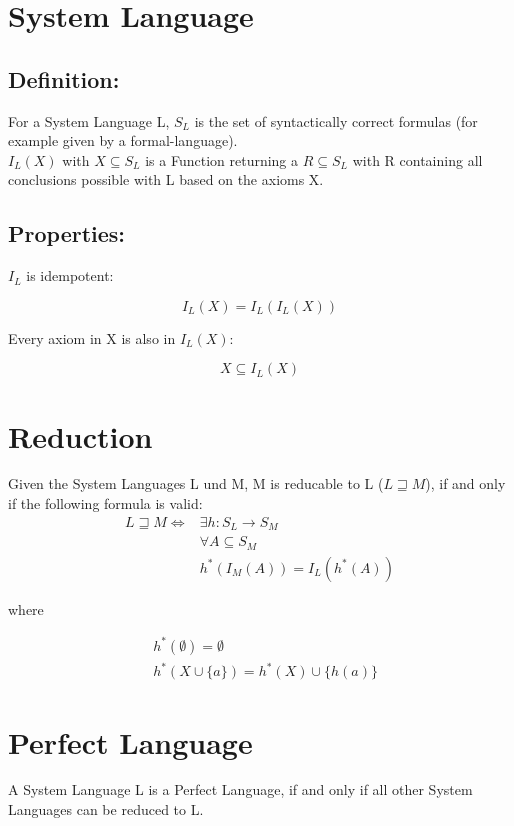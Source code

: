 \documentclass[11pt]{article}
\begin{document}
\section{System Language}
\subsection{Definition:}

For a System Language L, $S_L$ is the set of syntactically correct formulas (for example given by a formal-language).\\
$I_L(X)$ with $X \subseteq S_L$ is a Function returning a $R \subseteq S_L$ with R containing all conclusions possible with L based on the axioms X.

\subsection{Properties:}

$I_L$ is idempotent:

\[ I_L(X) = I_L(I_L(X)) \]

Every axiom in X is also in $I_L(X)$:

\[ X \subseteq I_L(X) \]

\section{Reduction}

Given the System Languages L und M, M is reducable to L ($L \sqsupseteq M$), if and only if the following formula is valid:
\begin{align*}
L \sqsupseteq M \iff &\exists h: S_L \rightarrow S_M \\
&\forall A \subseteq S_M \\
&h^*(I_M(A)) = I_L(h^*(A))
\end{align*}

where

\begin{align*}
&h^*(\emptyset) = \emptyset \\
&h^*(X \cup \{a\}) = h^*(X) \cup \{h(a)\}
\end{align*}

\section{Perfect Language}
A System Language L is a Perfect Language, if and only if all other System Languages can be reduced to L.
\end{document}
